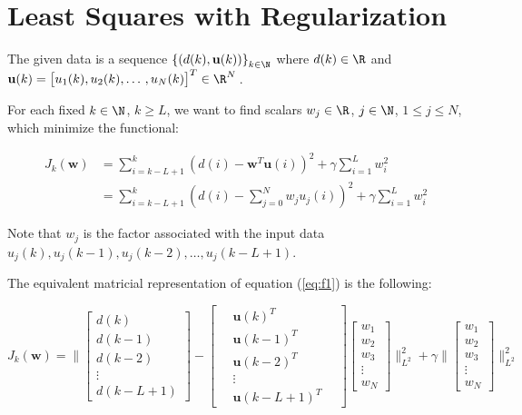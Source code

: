 \section{Least Squares with Regularization} \label{sec:proposal}

The given data is a sequence $\left\{ \left(d(k),\mathbf{u}(k) \right) \right\}_{k\in\N}$ where $
d(k)\in\R $ and $\mathbf{u}(k) = \big[ u_1(k), u_2(k), \dots\,, u_N(k) \big]^T\in\R^N\,$.

For each fixed $k\in\N$, $k\geq L$, we want to find scalars $w_j\in\R$,
$j\in\N$, $1\leq j\leq N$,
which minimize the functional:

\begin{eqnarray}
J_k(\mathbf{w}) &=\sum_{i=k-L+1}^{k}\left( d(i) - \mathbf{w}^T \mathbf{u}(i)\right)^2 + \gamma \sum_{i=1}^{L} w_i^2 \nonumber\\
&=\sum_{i=k-L+1}^{k}\left( d(i) - \sum_{j=0}^{N} w_j u_j(i)\right)^2 + \gamma \sum_{i=1}^{L} w_i^2
\label{eq:f1}
\end{eqnarray}


Note that $w_j$ is the factor associated with the input data
$u_j(k),u_j(k-1),u_j(k-2),\dots,u_j(k-L+1)$.

The equivalent matricial representation of equation (\ref{eq:f1}) is the following:

\begin{equation}
J_k(\mathbf{w})=\bigg\| 
\begin{bmatrix}
d(k) \\ d(k-1) \\ d(k-2) \\ \vdots \\ d(k-L+1)
\end{bmatrix}
- \begin{bmatrix}
\, & \mathbf{u}(k)^T & \, \\
\, & \mathbf{u}(k-1)^T & \, \\
\, & \mathbf{u}(k-2)^T & \, \\
\,  & \vdots & \, \\
\, & \mathbf{u}(k-L+1)^T & \,
\end{bmatrix}
\begin{bmatrix}
w_1 \\ w_2 \\ w_3 \\ \vdots \\ w_N
\end{bmatrix}
\bigg\|_{L^2}^2
+
\gamma \bigg\|
\begin{bmatrix}
w_1 \\ w_2 \\ w_3 \\ \vdots \\ w_N
\end{bmatrix}
\bigg\|_{L^2}^2
\label{eq:f2}
\end{equation}



